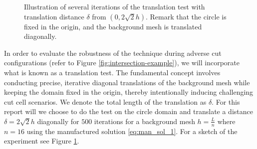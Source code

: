 \documentclass[11pt]{article}
\theoremstyle{remark}
\numberwithin{equation}{section}
\begin{document}
\begin{figure}[h!]
    \centering
    \caption{Illustration of several iterations of the translation test with translation distance $\delta$ from  $(0,2 \sqrt{2}h)  $. Remark that the circle is fixed in the origin, and the background mesh is translated diagonally. }
    \label{fig:illustration_translation}
\end{figure}

In order to evaluate the robustness of the technique during adverse cut configurations (refer to Figure \ref{fig:intersection-example}), we will incorporate what is known as a translation test. The fundamental concept involves conducting precise,
iterative diagonal translations of the background mesh while keeping the domain fixed in the origin, thereby intentionally inducing challenging cut cell scenarios. We denote the total length of the translation as $ \delta$. For this report will we
choose to do the test on the circle domain and translate a distance $\delta = 2\sqrt{2}h  $ diagonally for $500$ iterations for a background mesh $h = \frac{L}{n}$ where $n=16$ using the manufactured solution \eqref{eq:man_sol_1}. For a sketch of the experiment see Figure \ref{fig:illustration_translation}.
\end{document}
